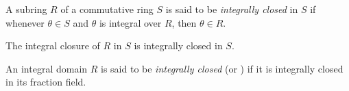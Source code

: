 \documentclass[12pt]{article}
\begin{document}
A subring $R$ of a commutative ring $S$ is said to be {\em integrally closed} in $S$ if whenever $\theta \in S$ and $\theta$ is integral over $R$, then $\theta \in R$.

The integral closure of $R$ in $S$ is integrally closed in $S$.

An integral domain $R$ is said to be {\em integrally closed} (or {\em {}}) if it is integrally closed in its fraction field.
\end{document}
